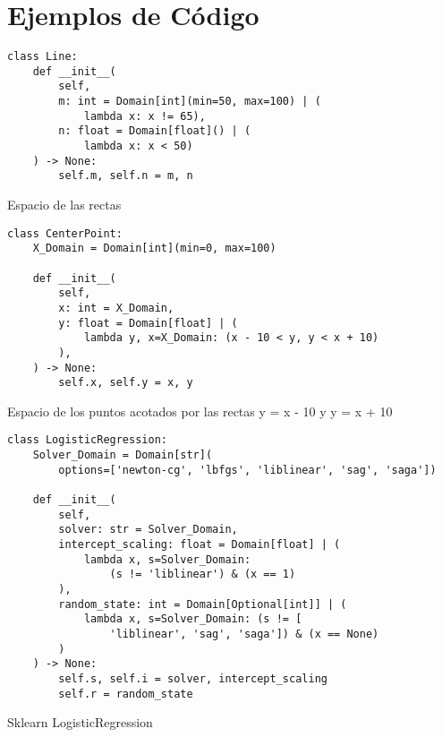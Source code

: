 \tableofcontents

\chapter*{Ejemplos de Código}\label{chapter:examples}

\begin{listing}[!ht]
    \begin{verbatim}
class Line:
    def __init__(
        self,
        m: int = Domain[int](min=50, max=100) | (
            lambda x: x != 65),
        n: float = Domain[float]() | (
            lambda x: x < 50)
    ) -> None:
        self.m, self.n = m, n
    \end{verbatim}
    \caption{Espacio de las rectas}
    \label{lst:rectas}
\end{listing}


\begin{listing}[!ht]
    \begin{verbatim}
class CenterPoint:
    X_Domain = Domain[int](min=0, max=100)

    def __init__(
        self,
        x: int = X_Domain,
        y: float = Domain[float] | (
            lambda y, x=X_Domain: (x - 10 < y, y < x + 10)
        ),
    ) -> None:
        self.x, self.y = x, y
    \end{verbatim}
    \caption{Espacio de los puntos acotados por las rectas y = x - 10 y y = x + 10}
    \label{lst:points}
\end{listing}

\begin{listing}[!ht]
    \begin{verbatim}
class LogisticRegression:
    Solver_Domain = Domain[str](
        options=['newton-cg', 'lbfgs', 'liblinear', 'sag', 'saga'])

    def __init__(
        self,
        solver: str = Solver_Domain,
        intercept_scaling: float = Domain[float] | (
            lambda x, s=Solver_Domain: 
                (s != 'liblinear') & (x == 1)
        ),
        random_state: int = Domain[Optional[int]] | (
            lambda x, s=Solver_Domain: (s != [
                'liblinear', 'sag', 'saga']) & (x == None)
        )
    ) -> None:
        self.s, self.i = solver, intercept_scaling
        self.r = random_state
    \end{verbatim}
    \caption{Sklearn LogisticRegression}
    \label{lst:sklearn}
\end{listing}

